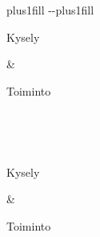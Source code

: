 \documentclass[letterpaper,10pt,finnish]{sphinxmanual}
\begin{document}
\begin{savenotes}
\sphinxatlongtablestart
\sphinxthistablewithglobalstyle
\makeatletter
  \LTleft \@totalleftmargin plus1fill
  \LTright\dimexpr\columnwidth-\@totalleftmargin-\linewidth\relax plus1fill
\makeatother
\begin{longtable}{}
\sphinxtoprule
\begin{varwidth}[t]{}
\sphinxstyletheadfamily \sphinxAtStartPar
Kysely
\sphinxbeforeendvarwidth
\end{varwidth}%
&\begin{varwidth}[t]{}
\sphinxstyletheadfamily \sphinxAtStartPar
Toiminto
\sphinxbeforeendvarwidth
\end{varwidth}%
\\
\sphinxmidrule
\endfirsthead

\\
\sphinxtoprule
\begin{varwidth}[t]{}
\sphinxstyletheadfamily \sphinxAtStartPar
Kysely
\sphinxbeforeendvarwidth
\end{varwidth}%
&\begin{varwidth}[t]{}
\sphinxstyletheadfamily \sphinxAtStartPar
Toiminto
\sphinxbeforeendvarwidth
\end{varwidth}%
\\
\sphinxmidrule
\endhead

\sphinxbottomrule
{}\\
\endfoot


\end{longtable}
\end{savenotes}
\end{document}
